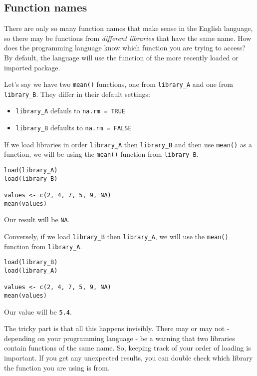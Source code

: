 \documentclass[
]{book}
\providecommand{\tightlist}{%
  \setlength{\itemsep}{0pt}\setlength{\parskip}{0pt}}
\begin{document}
\subsection{Function names}\label{function-names}

There are only so many function names that make sense in the English language, so there may be functions from \emph{different libraries} that have the same name. How does the programming language know which function you are trying to access? By default, the language will use the function of the more recently loaded or imported package.

Let's say we have two \texttt{mean()} functions, one from \texttt{library\_A} and one from \texttt{library\_B}. They differ in their default settings:

\begin{itemize}
\tightlist
\item
  \texttt{library\_A} defauls to \texttt{na.rm\ =\ TRUE}
\item
  \texttt{library\_B} defaults to \texttt{na.rm\ =\ FALSE}
\end{itemize}

If we load libraries in order \texttt{library\_A} then \texttt{library\_B} and then use \texttt{mean()} as a function, we will be using the \texttt{mean()} function from \texttt{library\_B}.

\begin{verbatim}
load(library_A)
load(library_B)

values <- c(2, 4, 7, 5, 9, NA)
mean(values)
\end{verbatim}

Our result will be \texttt{NA}.

Conversely, if we load \texttt{library\_B} then \texttt{library\_A}, we will use the \texttt{mean()} function from \texttt{library\_A}.

\begin{verbatim}
load(library_B)
load(library_A)

values <- c(2, 4, 7, 5, 9, NA)
mean(values)
\end{verbatim}

Our value will be \texttt{5.4}.

The tricky part is that all this happens invisibly. There may or may not - depending on your programming language - be a warning that two libraries contain functions of the same name. So, keeping track of your order of loading is important. If you get any unexpected results, you can double check which library the function you are using is from.\\
\end{document}
